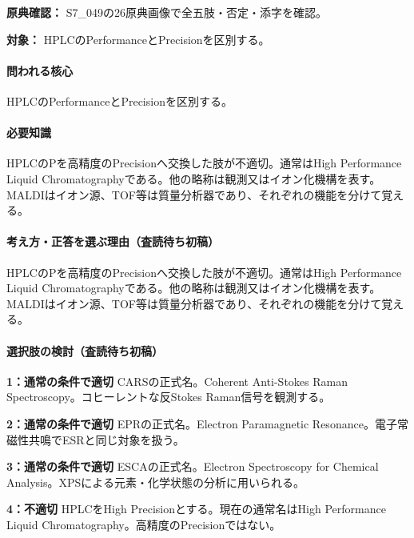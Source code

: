 \noindent\textbf{原典確認：} S7\_049の26原典画像で全五肢・否定・添字を確認。\par

\noindent\textbf{対象：} HPLCのPerformanceとPrecisionを区別する。\par

\paragraph{問われる核心} HPLCのPerformanceとPrecisionを区別する。

\paragraph{必要知識} HPLCのPを高精度のPrecisionへ交換した肢が不適切。通常はHigh Performance Liquid Chromatographyである。他の略称は観測又はイオン化機構を表す。MALDIはイオン源、TOF等は質量分析器であり、それぞれの機能を分けて覚える。

\paragraph{考え方・正答を選ぶ理由（査読待ち初稿）} HPLCのPを高精度のPrecisionへ交換した肢が不適切。通常はHigh Performance Liquid Chromatographyである。他の略称は観測又はイオン化機構を表す。MALDIはイオン源、TOF等は質量分析器であり、それぞれの機能を分けて覚える。

\paragraph{選択肢の検討（査読待ち初稿）}\mbox{}\par

\noindent\textbf{1：通常の条件で適切} CARSの正式名。Coherent Anti-Stokes Raman Spectroscopy。コヒーレントな反Stokes Raman信号を観測する。\par

\noindent\textbf{2：通常の条件で適切} EPRの正式名。Electron Paramagnetic Resonance。電子常磁性共鳴でESRと同じ対象を扱う。\par

\noindent\textbf{3：通常の条件で適切} ESCAの正式名。Electron Spectroscopy for Chemical Analysis。XPSによる元素・化学状態の分析に用いられる。\par

\noindent\textbf{4：不適切} HPLCをHigh Precisionとする。現在の通常名はHigh Performance Liquid Chromatography。高精度のPrecisionではない。\par

